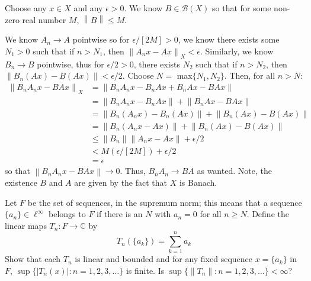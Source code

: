 \documentclass{article}
\newcommand{\norm}[1]{\left\lVert#1\right\rVert}
\begin{document}
    \begin{Answer}
        Choose any $x\in X$ and any $\epsilon>0$. We know $B\in\mathscr{B}(X)$ so that for some non-zero real number $M$, $\norm{B}\leq M$.
        
        We know $A_n\to A$ pointwise so for $\epsilon/[2M]>0$, we know there exists some $N_1>0$ such that if 
        $n>N_1$, then $\norm{A_nx - Ax}_X<\epsilon$. Similarly, we know $B_n\to B$ pointwise, thus for $\epsilon/2>0$, there exists $N_2$
        such that if $n>N_2$, then $\norm{B_n(Ax) - B(Ax)} < \epsilon/2$. Choose $N =$ max$\{N_1,N_2\}$. Then, for all $n>N$:
        \begin{align*}
            \norm{B_nA_nx - BAx}_X &= \norm{B_nA_nx - B_nAx + B_nAx - BAx} \\
                &= \norm{B_nA_nx - B_nAx} + \norm{B_nAx - BAx} \\
                &= \norm{B_n(A_nx) - B_n(Ax)} + \norm{B_n(Ax) - B(Ax)} \\
                &= \norm{B_n(A_nx - Ax)} + \norm{B_n(Ax) - B(Ax)} \\
                &\leq \norm{B_n}\norm{A_nx - Ax} + \epsilon/2 \\
                &< M(\epsilon/[2M]) + \epsilon/2 \\
                &= \epsilon
        \end{align*}
        so that $\norm{B_nA_nx - BAx}\to 0$. Thus, $B_nA_n\to BA$ as wanted. Note, the existence $B$ and $A$ are given by the fact that
        $X$ is Banach.
    \end{Answer}

    \newpage
    \begin{Exercise}
        Let $F$ be the set of  sequences, in the supremum norm; this means that a sequence $\{a_n\}\in\ell^{\infty}$ belongs
        to $F$ if there is an $N$ with $a_n = 0$ for all $n\geq N$. Define the linear maps $T_n:F\to\mathbb{C}$ by
        \[ T_n(\{a_k\}) = \sum_{k=1}^n a_k \]
        Show that each $T_n$ is linear and bounded and for any fixed sequence $x = \{a_k\}$ in $F$, $\sup\{|T_n(x)|:n=1,2,3,\hdots\}$ is finite.
        Is $\sup\{\norm{T_n}:n=1,2,3,\hdots\} < \infty$?
    \end{Exercise}
\end{document}
